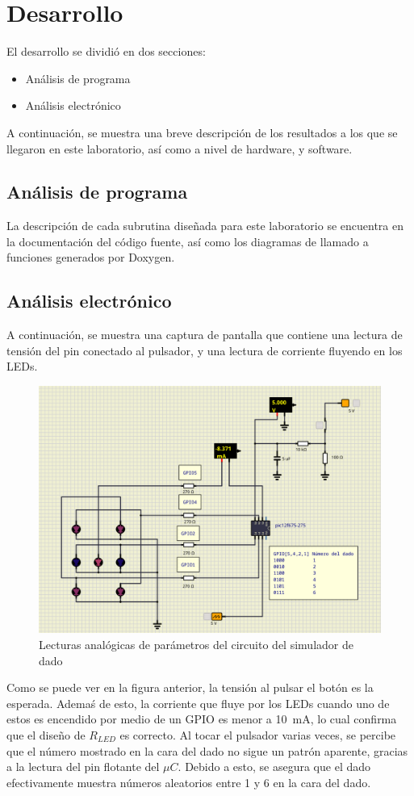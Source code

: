 \section{Desarrollo}

El desarrollo se dividió en dos secciones:
\begin{itemize}
    \item Análisis de programa
    \item Análisis electrónico
\end{itemize}

A continuación, se muestra una breve descripción de los resultados a los que se llegaron en este laboratorio, así como a nivel de hardware, y software.

\subsection{Análisis de programa}
La descripción de cada subrutina diseñada para este laboratorio se encuentra en la documentación del código fuente, así como los diagramas de llamado a funciones generados por Doxygen. 

\subsection{Análisis electrónico}

A continuación, se muestra una captura de pantalla que contiene una lectura de tensión del pin conectado al pulsador, y una lectura de corriente fluyendo en los LEDs. 

\begin{figure}[!h]
    \centering
    \includegraphics[width = 0.8\linewidth]{imagenes/fig12.png}
    \caption{Lecturas analógicas de parámetros del circuito del simulador de dado}
    \label{fig13}
\end{figure}

Como se puede ver en la figura anterior, la tensión al pulsar el botón es la esperada. Ademaś de esto, la corriente que fluye por los LEDs cuando uno de estos es encendido por medio de un GPIO es menor a \SI{10}{mA}, lo cual confirma que el diseño de $R _{LED}$ es correcto.
Al tocar el pulsador varias veces, se percibe que el número mostrado en la cara del dado no sigue un patrón aparente, gracias a la lectura del pin flotante del $\mu C$. Debido a esto, se asegura que el dado efectivamente muestra números aleatorios entre 1 y 6 en la cara del dado.


